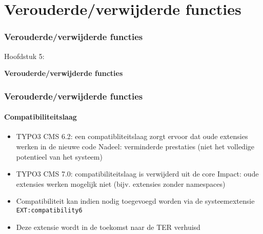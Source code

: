 %

\section{Verouderde/verwijderde functies}
\begin{frame}[fragile]
	\frametitle{Verouderde/verwijderde functies}

	\begin{center}\huge{Hoofdstuk 5:}\end{center}
	\begin{center}\huge{\color{typo3darkgrey}\textbf{Verouderde/verwijderde functies}}\end{center}

\end{frame}


\begin{frame}[fragile]
	\frametitle{Verouderde/verwijderde functies}
	\framesubtitle{Compatibiliteitslaag}

	\begin{itemize}

		\item TYPO3 CMS 6.2: een compatibliteitslaag zorgt ervoor dat oude extensies werken in de nieuwe code\newline
			\small
				Nadeel: verminderde prestaties (niet het volledige potentieel van het systeem)
			\normalsize

		\item TYPO3 CMS 7.0: compatibiliteitslaag is verwijderd uit de core\newline
			\small
				Impact: oude extensies werken mogelijk niet (bijv. extensies zonder namespaces)
			\normalsize

		\item Compatibiliteit kan indien nodig toegevoegd worden via de systeemextensie \texttt{EXT:compatibility6}
		\item Deze extensie wordt in de toekomst naar de TER verhuisd

	\end{itemize}

\end{frame}

